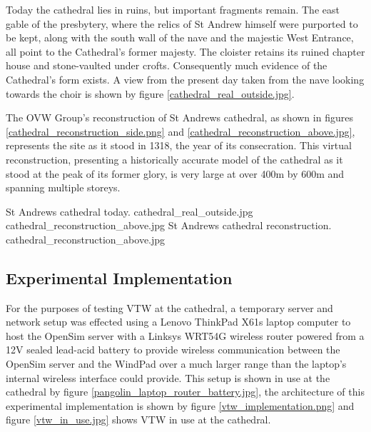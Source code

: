 Today the cathedral lies in ruins, but important fragments remain. The east gable of the presbytery, where the relics of St Andrew himself were purported to be kept, along with the south wall of the nave and the majestic West Entrance, all point to the Cathedral's former majesty. The cloister retains its ruined chapter house and stone-vaulted under crofts. Consequently much evidence of the Cathedral's form exists. A view from the present day taken from the nave looking towards the choir is shown by figure \ref{cathedral_real_outside.jpg}.


The OVW Group's reconstruction of St Andrews cathedral, as shown in figures \ref{cathedral_reconstruction_side.png} and \ref{cathedral_reconstruction_above.jpg}, represents the site as it stood in 1318, the year of its consecration. This virtual reconstruction, presenting a historically accurate model of the cathedral as it stood at the peak of its former glory, is very large at over 400m by 600m and spanning multiple storeys.

 {St Andrews cathedral today.} {cathedral_real_outside.jpg}
       {cathedral_reconstruction_above.jpg} {St Andrews cathedral reconstruction.} {cathedral_reconstruction_above.jpg}


\subsection{Experimental Implementation}




For the purposes of testing VTW at the cathedral, a temporary server and network setup was effected using a Lenovo ThinkPad X61s\thinkpadFootnote{} laptop computer to host the OpenSim server with a Linksys WRT54G\wrtFootnote{} wireless router powered from a 12V sealed lead-acid battery to provide wireless communication between the OpenSim server and the WindPad over a much larger range than the laptop's internal wireless interface could provide. This setup is shown in use at the cathedral by figure \ref{pangolin_laptop_router_battery.jpg}, the architecture of this experimental implementation is shown by figure \ref{vtw_implementation.png} and figure \ref{vtw_in_use.jpg} shows VTW in use at the cathedral.

